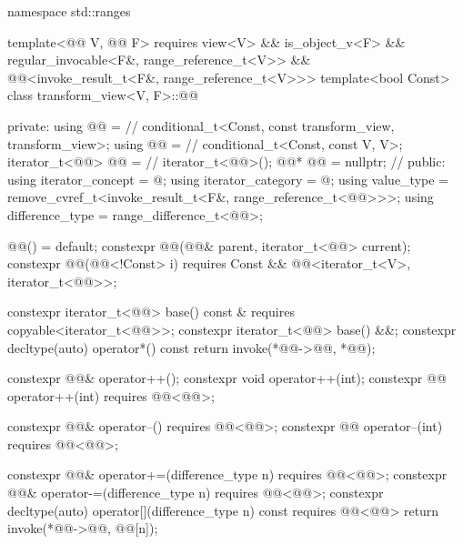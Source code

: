 %
\begin{codeblock}
namespace std::ranges {
  template<@@ V, @@ F>
    requires view<V> && is_object_v<F> &&
             regular_invocable<F&, range_reference_t<V>> &&
             @@<invoke_result_t<F&, range_reference_t<V>>>
  template<bool Const>
  class transform_view<V, F>::@@ {
  private:
    using @@ =                              // \expos
      conditional_t<Const, const transform_view, transform_view>;
    using @@   =                              // \expos
      conditional_t<Const, const V, V>;
    iterator_t<@@> @@ =                 // \expos
      iterator_t<@@>();
    @@* @@ = nullptr;                  // \expos
  public:
    using iterator_concept  = @\seebelow@;
    using iterator_category = @\seebelow@;
    using value_type        =
      remove_cvref_t<invoke_result_t<F&, range_reference_t<@@>>>;
    using difference_type   = range_difference_t<@@>;

    @@() = default;
    constexpr @@(@@& parent, iterator_t<@@> current);
    constexpr @@(@@<!Const> i)
      requires Const && @@<iterator_t<V>, iterator_t<@@>>;

    constexpr iterator_t<@@> base() const &
      requires copyable<iterator_t<@@>>;
    constexpr iterator_t<@@> base() &&;
    constexpr decltype(auto) operator*() const
    { return invoke(*@@->@@, *@@); }

    constexpr @@& operator++();
    constexpr void operator++(int);
    constexpr @@ operator++(int) requires @@<@@>;

    constexpr @@& operator--() requires @@<@@>;
    constexpr @@ operator--(int) requires @@<@@>;

    constexpr @@& operator+=(difference_type n)
      requires @@<@@>;
    constexpr @@& operator-=(difference_type n)
      requires @@<@@>;
    constexpr decltype(auto) operator[](difference_type n) const
      requires @@<@@>
    { return invoke(*@@->@@, @@[n]); }

}}
\end{codeblock}
